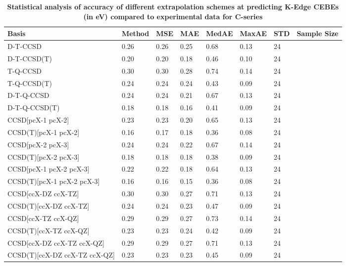 \begin{table}
  \caption{\textbf{Statistical analysis of accuracy of different extrapolation schemes at predicting K-Edge CEBEs (in eV) compared to experimental data for C-series}}
  \label{tbl:extrap-scheme-summary-c}
  \begin{tabular}{l l l l l l l l }
    \toprule
    \textbf{Basis} & \textbf{Method} & \textbf{MSE} & \textbf{MAE} & \textbf{MedAE} & \textbf{MaxAE} & \textbf{STD} & \textbf{Sample Size} \\ 
    \midrule
    D-T-CCSD & 0.26 & 0.26 & 0.25 & 0.68 & 0.13 & 24 \\ 
    D-T-CCSD(T) & 0.20 & 0.20 & 0.18 & 0.46 & 0.10 & 24 \\ 
    T-Q-CCSD & 0.30 & 0.30 & 0.28 & 0.74 & 0.14 & 24 \\ 
    T-Q-CCSD(T) & 0.24 & 0.24 & 0.24 & 0.43 & 0.09 & 24 \\ 
    D-T-Q-CCSD & 0.24 & 0.24 & 0.21 & 0.67 & 0.13 & 24 \\ 
    D-T-Q-CCSD(T) & 0.18 & 0.18 & 0.16 & 0.41 & 0.09 & 24 \\ 
    CCSD[pcX-1 pcX-2] & 0.23 & 0.23 & 0.20 & 0.65 & 0.13 & 24 \\ 
    CCSD(T)[pcX-1 pcX-2] & 0.16 & 0.17 & 0.18 & 0.36 & 0.08 & 24 \\ 
    CCSD[pcX-2 pcX-3] & 0.24 & 0.24 & 0.22 & 0.67 & 0.14 & 24 \\ 
    CCSD(T)[pcX-2 pcX-3] & 0.18 & 0.18 & 0.18 & 0.38 & 0.09 & 24 \\ 
    CCSD[pcX-1 pcX-2 pcX-3] & 0.22 & 0.22 & 0.18 & 0.64 & 0.13 & 24 \\ 
    CCSD(T)[pcX-1 pcX-2 pcX-3] & 0.16 & 0.16 & 0.15 & 0.36 & 0.08 & 24 \\ 
    CCSD[ccX-DZ ccX-TZ] & 0.30 & 0.30 & 0.27 & 0.71 & 0.13 & 24 \\ 
    CCSD(T)[ccX-DZ ccX-TZ] & 0.24 & 0.24 & 0.23 & 0.47 & 0.09 & 24 \\ 
    CCSD[ccX-TZ ccX-QZ] & 0.29 & 0.29 & 0.27 & 0.73 & 0.14 & 24 \\ 
    CCSD(T)[ccX-TZ ccX-QZ] & 0.23 & 0.23 & 0.24 & 0.42 & 0.09 & 24 \\ 
    CCSD[ccX-DZ ccX-TZ ccX-QZ] & 0.29 & 0.29 & 0.27 & 0.71 & 0.13 & 24 \\ 
    CCSD(T)[ccX-DZ ccX-TZ ccX-QZ] & 0.23 & 0.23 & 0.23 & 0.45 & 0.09 & 24 \\ 
    \bottomrule
  \end{tabular}
\end{table}
